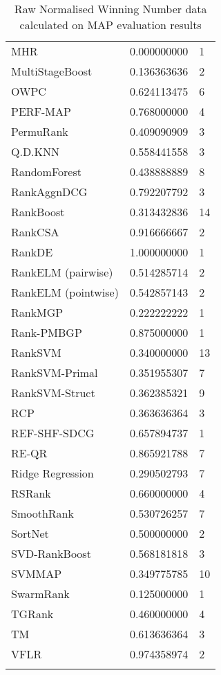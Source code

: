 \begin{longtable}{l|l|l}
MHR & 0.000000000 & 1 \\ 
MultiStageBoost & 0.136363636 & 2 \\ 
OWPC & 0.624113475 & 6 \\ 
PERF-\acs{MAP} & 0.768000000 & 4 \\ 
PermuRank & 0.409090909 & 3 \\ 
Q.D.\acs{KNN} & 0.558441558 & 3 \\ 
RandomForest & 0.438888889 & 8 \\ 
RankAgg\acs{nDCG} & 0.792207792 & 3 \\ 
RankBoost & 0.313432836 & 14 \\ 
RankCSA & 0.916666667 & 2 \\ 
RankDE & 1.000000000 & 1 \\ 
RankELM (pairwise) & 0.514285714 & 2 \\ 
RankELM (pointwise) & 0.542857143 & 2 \\ 
RankMGP & 0.222222222 & 1 \\ 
Rank-PMBGP & 0.875000000 & 1 \\ 
Rank\acs{SVM} & 0.340000000 & 13 \\ 
Rank\acs{SVM}-Primal & 0.351955307 & 7 \\ 
Rank\acs{SVM}-Struct & 0.362385321 & 9 \\ 
RCP & 0.363636364 & 3 \\ 
REF-SHF-SDCG & 0.657894737 & 1 \\ 
RE-QR & 0.865921788 & 7 \\ 
Ridge Regression & 0.290502793 & 7 \\ 
RSRank & 0.660000000 & 4 \\ 
SmoothRank & 0.530726257 & 7 \\ 
SortNet & 0.500000000 & 2 \\ 
\acs{SVD}-RankBoost & 0.568181818 & 3 \\ 
\acs{SVM}\acs{MAP} & 0.349775785 & 10 \\ 
SwarmRank & 0.125000000 & 1 \\ 
TGRank & 0.460000000 & 4 \\ 
TM & 0.613636364 & 3 \\ 
VFLR & 0.974358974 & 2 \\ 
\caption{Raw Normalised Winning Number data calculated on \acs{MAP} evaluation results}
\label{tab:raw_data_norm_winnum_map}
\end{longtable}
